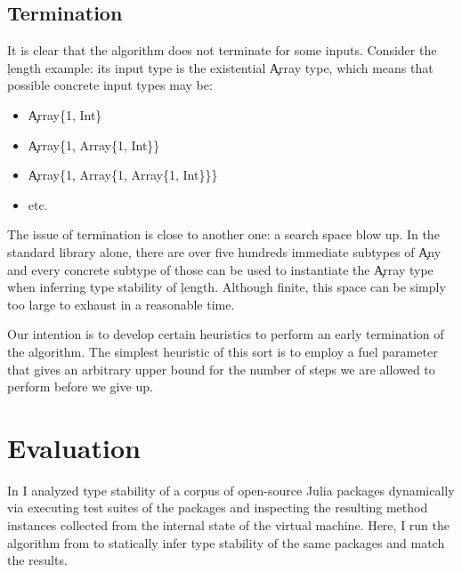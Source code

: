 \subsection{Termination}%
\label{sec:term}

It is clear that the algorithm does not terminate for some inputs. Consider the
\c{length} example: its input type is the existential \c{Array} type, which
means that possible concrete input types may be:
\begin{itemize}

  \item \c{Array\{1, Int\}}
  \item \c{Array\{1, Array\{1, Int\}\}}
  \item \c{Array\{1, Array\{1, Array\{1, Int\}\}\}}
  \item etc.
\end{itemize}

The issue of termination is close to another one: a search space blow up.
In the standard library alone, there are over five hundreds immediate subtypes
of \c{Any} and every concrete subtype of those can be used to instantiate the
\c{Array} type when inferring type stability of \c{length}. Although finite, this
space can be simply too large to exhaust in a reasonable time.

Our intention is to develop certain heuristics to perform an early termination
of the algorithm. The simplest heuristic of this sort is to employ a fuel
parameter that gives an arbitrary upper bound for the number of steps we are
allowed to perform before we give up.

\section{Evaluation}%
\label{sec:approx:eval}

In  I analyzed type stability of a corpus of open-source
Julia packages dynamically via executing test suites of the packages and
inspecting the resulting method instances collected from the internal state of
the virtual machine. Here, I run the algorithm from  to
statically infer type stability of the same packages and match the
results.

